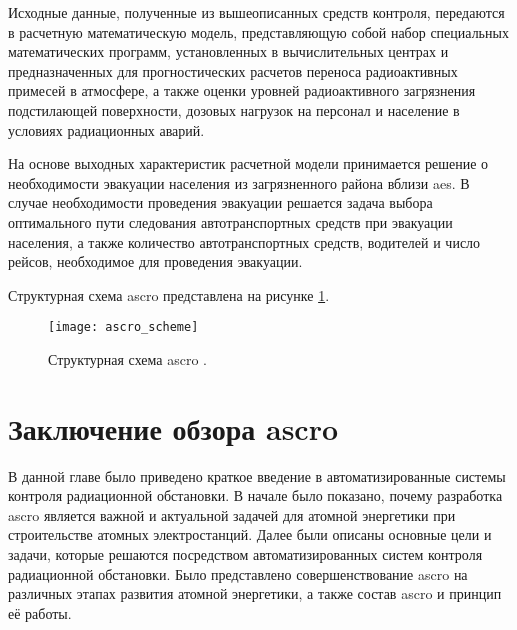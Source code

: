 Исходные данные, полученные из вышеописанных средств контроля, передаются в расчетную математическую модель,  
представляющую собой набор специальных математических программ, установленных в вычислительных центрах и предназначенных 
для прогностических расчетов переноса радиоактивных примесей в атмосфере, а также оценки уровней радиоактивного 
загрязнения подстилающей поверхности, дозовых нагрузок на персонал и население в условиях радиационных аварий.

На основе выходных характеристик расчетной модели принимается решение о необходимости эвакуации населения из 
загрязненного района вблизи \ac{aes}. В случае необходимости проведения эвакуации решается задача выбора оптимального 
пути следования автотранспортных средств при эвакуации населения, а также количество автотранспортных средств, водителей 
и число рейсов, необходимое для проведения эвакуации.

Структурная схема \ac{ascro} представлена на рисунке \ref{fig_ascro_scheme}.

\begin{figure}[ht!]
	\centering
	\texttt{[image: ascro\_scheme]}
	\captionsetup{justification=centering}
    \caption{Структурная схема \ac{ascro} \cite{elokhin}.}
    \label{fig_ascro_scheme}
\end{figure}

\section{Заключение обзора \ac{ascro}}

В данной главе было приведено краткое введение в автоматизированные системы контроля радиационной обстановки. В начале 
было показано, почему разработка \ac{ascro} является важной и актуальной задачей для атомной энергетики при 
строительстве атомных электростанций. Далее были описаны основные цели и задачи, которые решаются посредством 
автоматизированных систем контроля радиационной обстановки. Было представлено совершенствование \ac{ascro} на различных 
этапах развития атомной энергетики, а также состав \ac{ascro} и принцип её работы.